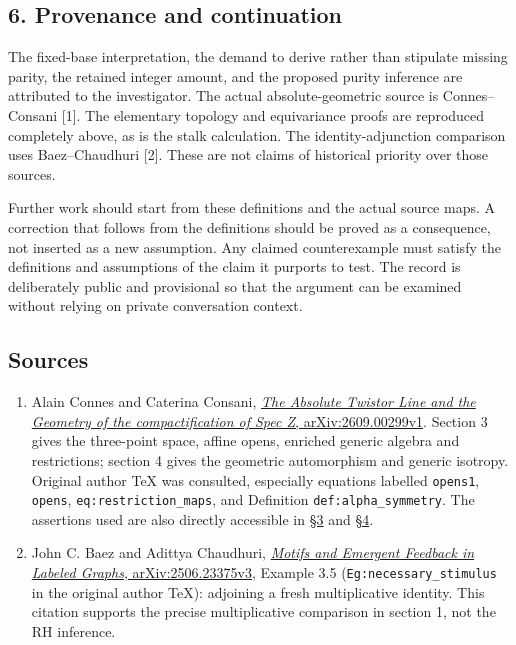 \documentclass[
]{article}
\providecommand{\tightlist}{%
  \setlength{\itemsep}{0pt}\setlength{\parskip}{0pt}}
\begin{document}
\subsection{6. Provenance and
continuation}\label{provenance-and-continuation}

The fixed-base interpretation, the demand to derive rather than
stipulate missing parity, the retained integer amount, and the proposed
purity inference are attributed to the investigator. The actual
absolute-geometric source is Connes--Consani {[}1{]}. The elementary
topology and equivariance proofs are reproduced completely above, as is
the stalk calculation. The identity-adjunction comparison uses
Baez--Chaudhuri {[}2{]}. These are not claims of historical priority
over those sources.

Further work should start from these definitions and the actual source
maps. A correction that follows from the definitions should be proved as
a consequence, not inserted as a new assumption. Any claimed
counterexample must satisfy the definitions and assumptions of the claim
it purports to test. The record is deliberately public and provisional
so that the argument can be examined without relying on private
conversation context.

\subsection{Sources}\label{sources}

\begin{enumerate}
\def\labelenumi{\arabic{enumi}.}
\tightlist
\item
  Alain Connes and Caterina Consani,
  \href{https://arxiv.org/html/2609.00299v1}{\emph{The Absolute Twistor
  Line and the Geometry of the compactification of Spec Z},
  arXiv:2609.00299v1}. Section 3 gives the three-point space, affine
  opens, enriched generic algebra and restrictions; section 4 gives the
  geometric automorphism and generic isotropy. Original author TeX was
  consulted, especially equations labelled \texttt{opens1},
  \texttt{opens}, \texttt{eq:restriction\_maps}, and Definition
  \texttt{def:alpha\_symmetry}. The assertions used are also directly
  accessible in \href{https://arxiv.org/html/2609.00299v1\#S3}{§3} and
  \href{https://arxiv.org/html/2609.00299v1\#S4}{§4}.
\item
  John C. Baez and Adittya Chaudhuri,
  \href{https://arxiv.org/html/2506.23375v3}{\emph{Motifs and Emergent
  Feedback in Labeled Graphs}, arXiv:2506.23375v3}, Example 3.5
  (\texttt{Eg:necessary\_stimulus} in the original author TeX):
  adjoining a fresh multiplicative identity. This citation supports the
  precise multiplicative comparison in section 1, not the RH inference.
\end{enumerate}
\end{document}
